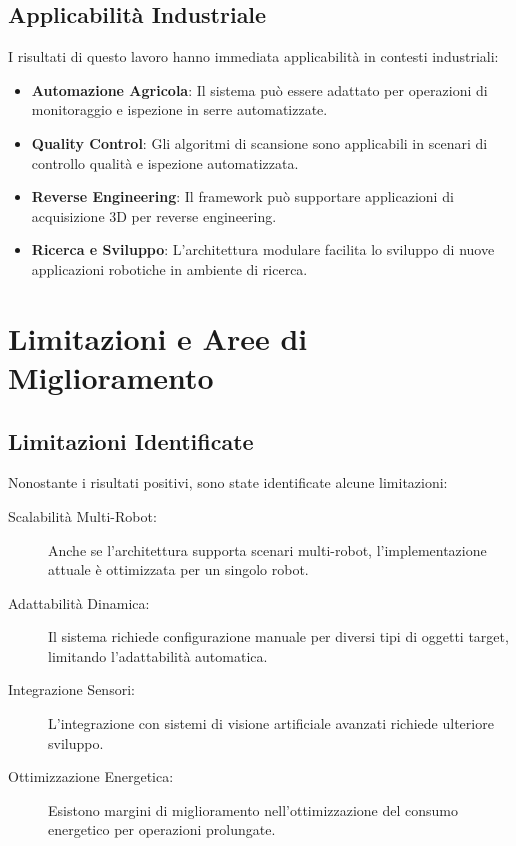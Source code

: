 \documentclass[12pt,a4paper,twoside,openright]{book}
\begin{document}
\subsection{Applicabilità Industriale}

I risultati di questo lavoro hanno immediata applicabilità in contesti industriali:

\begin{itemize}
    \item \textbf{Automazione Agricola}: Il sistema può essere adattato per operazioni di monitoraggio e ispezione in serre automatizzate.
    
    \item \textbf{Quality Control}: Gli algoritmi di scansione sono applicabili in scenari di controllo qualità e ispezione automatizzata.
    
    \item \textbf{Reverse Engineering}: Il framework può supportare applicazioni di acquisizione 3D per reverse engineering.
    
    \item \textbf{Ricerca e Sviluppo}: L'architettura modulare facilita lo sviluppo di nuove applicazioni robotiche in ambiente di ricerca.
\end{itemize}

\section{Limitazioni e Aree di Miglioramento}

\subsection{Limitazioni Identificate}

Nonostante i risultati positivi, sono state identificate alcune limitazioni:

\begin{description}
    \item[Scalabilità Multi-Robot:] Anche se l'architettura supporta scenari multi-robot, l'implementazione attuale è ottimizzata per un singolo robot.
    
    \item[Adattabilità Dinamica:] Il sistema richiede configurazione manuale per diversi tipi di oggetti target, limitando l'adattabilità automatica.
    
    \item[Integrazione Sensori:] L'integrazione con sistemi di visione artificiale avanzati richiede ulteriore sviluppo.
    
    \item[Ottimizzazione Energetica:] Esistono margini di miglioramento nell'ottimizzazione del consumo energetico per operazioni prolungate.
\end{description}
\end{document}
